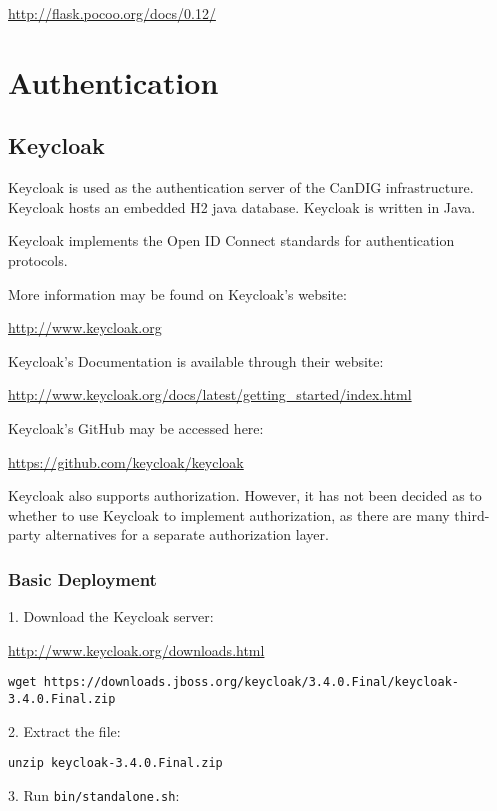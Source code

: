 \documentclass{article}
\begin{document}
\url{http://flask.pocoo.org/docs/0.12/}

\newpage

\section{Authentication}

\subsection{Keycloak}

Keycloak is used as the authentication server of the CanDIG infrastructure.
Keycloak hosts an embedded H2 java database.
Keycloak is written in Java.

Keycloak implements the Open ID Connect standards for authentication protocols.

More information may be found on Keycloak's website:

\url{http://www.keycloak.org}

Keycloak's Documentation is available through their website:

\url{http://www.keycloak.org/docs/latest/getting_started/index.html}

Keycloak's GitHub may be accessed here:

\url{https://github.com/keycloak/keycloak}

Keycloak also supports authorization. However, it has not been decided as to whether to use Keycloak to implement authorization, as there are many third-party alternatives for a separate authorization layer.

\subsubsection{Basic Deployment}

1. Download the Keycloak server:

\url{http://www.keycloak.org/downloads.html}

\begin{verbatim}
wget https://downloads.jboss.org/keycloak/3.4.0.Final/keycloak-3.4.0.Final.zip
\end{verbatim}

2. Extract the file:

\begin{verbatim}
unzip keycloak-3.4.0.Final.zip
\end{verbatim}

3. Run \texttt{bin/standalone.sh}:
\end{document}
